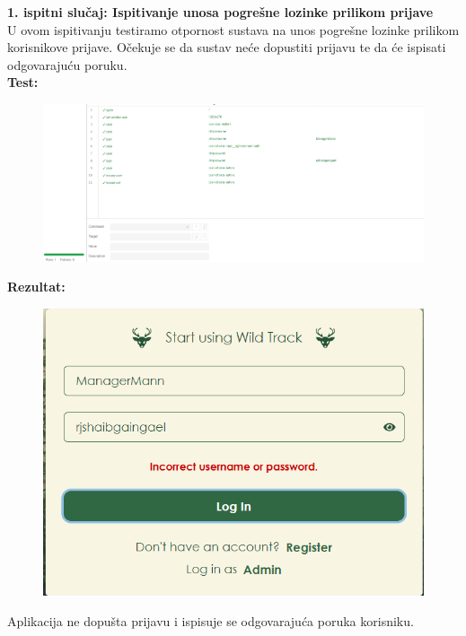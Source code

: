 \noindent \textbf{1. ispitni slučaj: Ispitivanje unosa pogrešne lozinke prilikom prijave}\\
U ovom ispitivanju testiramo otpornost sustava na unos pogrešne lozinke prilikom korisnikove prijave. Očekuje se da sustav neće dopustiti prijavu te da će ispisati odgovarajuću poruku. \\
\textbf{Test:}
\begin{figure}[H]
	\includegraphics[scale=0.4]{slike/selTest1.PNG} %
	\centering
\end{figure}
\noindent \textbf{Rezultat:}
\begin{figure}[H]
	\includegraphics[scale=0.6]{slike/selTestRes1.PNG} %
	\centering
\end{figure}
\noindent Aplikacija ne dopušta prijavu i ispisuje se odgovarajuća poruka korisniku. \\

